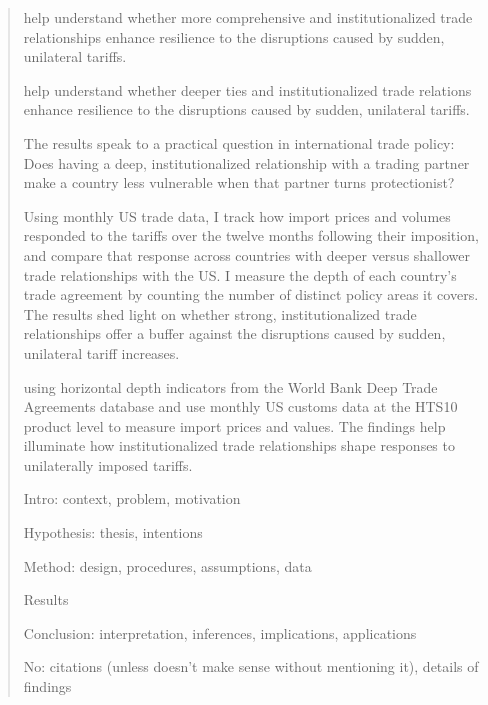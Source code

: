 \begin{abstract}
help understand whether more comprehensive and institutionalized trade relationships enhance resilience to the disruptions caused by sudden, unilateral tariffs.

help understand whether deeper ties and institutionalized trade relations enhance resilience to the disruptions caused by sudden, unilateral tariffs.

The results speak to a practical question in international trade policy: Does having a deep, institutionalized relationship with a trading partner make a country less vulnerable when that partner turns protectionist?

Using monthly US trade data, I track how import prices and volumes responded to the tariffs over the twelve months following their imposition, and compare that response across countries with deeper versus shallower trade relationships with the US. I measure the depth of each country's trade agreement by counting the number of distinct policy areas it covers. The results shed light on whether strong, institutionalized trade relationships offer a buffer against the disruptions caused by sudden, unilateral tariff increases.

 using horizontal depth indicators from the World Bank Deep Trade Agreements database and use monthly US customs data at the HTS10 product level to measure import prices and values. The findings help illuminate how institutionalized trade relationships shape responses to unilaterally imposed tariffs.

Intro: context, problem, motivation 

Hypothesis: thesis, intentions 

Method: design, procedures, assumptions, data 

Results 

Conclusion: interpretation, inferences, implications, applications 

No: citations (unless doesn't make sense without mentioning it), details of findings
\end{abstract}
